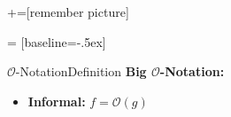 \usetikzlibrary{arrows,shapes}
+=[remember picture]


 = [baseline=-.5ex]

\begin{frame}{$\mathcal{O}$-Notation}{Definition}
  \textbf{Big $\mathcal{O}$-Notation:}%
  \begin{itemize}
    \item
      \textbf{Informal:} $f = \mathcal O(g)$\\
      

\end{itemize}
\end{frame}
